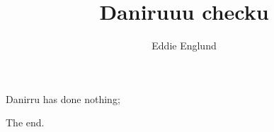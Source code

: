 \documentclass[12pt]{article}
\title{Daniruuu checku}
\author{Eddie Englund}
\begin{document}
    
    \maketitle

   
    Danirru has done nothing;

    The end.
\end{document}

